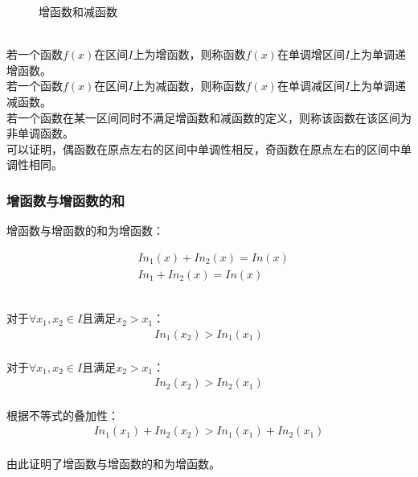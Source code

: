 \documentclass[UTF8]{ctexart}
\begin{document}
\begin{figure}[h]
\begin{center}
{
            }
            \caption{增函数和减函数}
        \end{center}
    \end{figure}\\
    若一个函数$f(x)$在区间$I$上为增函数，则称函数$f(x)$在单调增区间$I$上为单调递增函数。\\[3mm]
    若一个函数$f(x)$在区间$I$上为减函数，则称函数$f(x)$在单调减区间$I$上为单调递减函数。\\[3mm]
    若一个函数在某一区间同时不满足增函数和减函数的定义，则称该函数在该区间为非单调函数。\\[3mm]
    可以证明，偶函数在原点左右的区间中单调性相反，奇函数在原点左右的区间中单调性相同。

\newpage

\subsubsection{增函数与增函数的和}
    \setcounter{equation}{0}
    增函数与增函数的和为增函数：
    \begin{large}
        \begin{align*}
            &In_1(x)+In_2(x)=In(x)\\[3mm]
            &In_1+In_2(x)=In(x)
        \end{align*}
    \end{large}\\
    对于$\forall x_1,x_2\in I$且满足$x_2>x_1$：
    \begin{align}
        In_1(x_2)>In_1(x_1)
    \end{align}\\
    对于$\forall x_1,x_2\in I$且满足$x_2>x_1$：
    \begin{align}
        In_2(x_2)>In_2(x_1)
    \end{align}\\
    根据不等式的叠加性：
    \begin{align}
        In_1(x_1)+In_2(x_2)>In_1(x_1)+In_2(x_1)
    \end{align}\\
    由此证明了增函数与增函数的和为增函数。\vspace{6pt}
\end{document}
